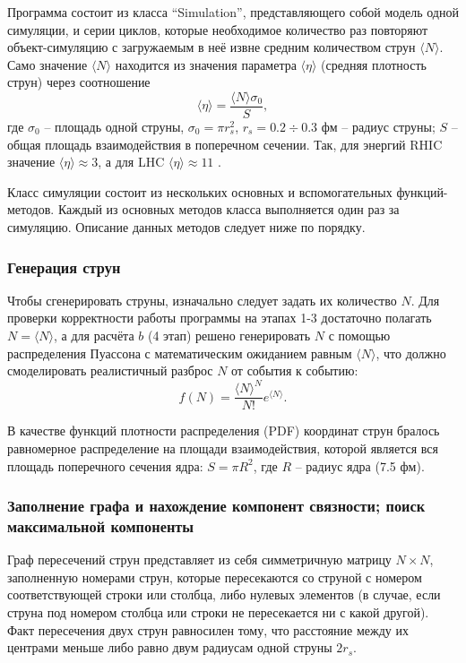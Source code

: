 Программа состоит из класса ``Simulation'', представляющего собой модель одной симуляции, и серии циклов, которые необходимое количество раз повторяют объект-симуляцию с загружаемым в неё извне средним количеством струн $\langle N \rangle$. Само значение $\langle N \rangle$ находится из значения параметра $\langle \eta \rangle$ (средняя плотность струн) через соотношение 
\begin{equation} \label{eq:eta}
	\langle \eta \rangle = \frac{\langle N \rangle \sigma_0}{S},
\end{equation}
где $\sigma_0$ -- площадь одной струны, $\sigma_0 = \pi r_s^2$, $r_s = 0.2 \div 0.3$ фм -- радиус струны; $S$ -- общая площадь взаимодействия в поперечном сечении.
Так, для энергий RHIC значение $\langle \eta \rangle \approx 3$, а для LHC $\langle \eta \rangle \approx 11$ \cite{RHICandLHC}. 

Класс симуляции состоит из нескольких основных и вспомогательных функций-методов. Каждый из основных методов класса выполняется один раз за симуляцию. Описание данных методов следует ниже по порядку.
\subsubsection{Генерация струн}
Чтобы сгенерировать струны, изначально следует задать их количество $N$. 
Для проверки корректности работы программы на этапах 1-3 достаточно полагать $N = \langle N \rangle$, а для расчёта $b$ (4 этап) решено генерировать $N$ с помощью распределения Пуассона с математическим ожиданием равным $\langle N \rangle$, что должно смоделировать реалистичный разброс $N$ от события к событию:
\begin{equation} \label{eq:poisson}
	f(N) = \frac{\langle N \rangle ^ N}{N!} e^{\langle N \rangle}.
\end{equation}

В качестве функций плотности распределения (PDF) координат струн бралось равномерное распределение на площади взаимодействия, которой является вся площадь поперечного сечения ядра: $S = \pi R^2$, где $R$ -- радиус ядра (7.5 фм).
\subsubsection{Заполнение графа и нахождение компонент связности; поиск максимальной компоненты}
Граф пересечений струн представляет из себя симметричную матрицу $N \times N$, заполненную номерами струн, которые пересекаются со струной с номером соответствующей строки или столбца, либо нулевых элементов (в случае, если струна под номером столбца или строки не пересекается ни с какой другой). Факт пересечения двух струн равносилен тому, что расстояние между их центрами меньше либо равно двум радиусам одной струны $2r_s$.

